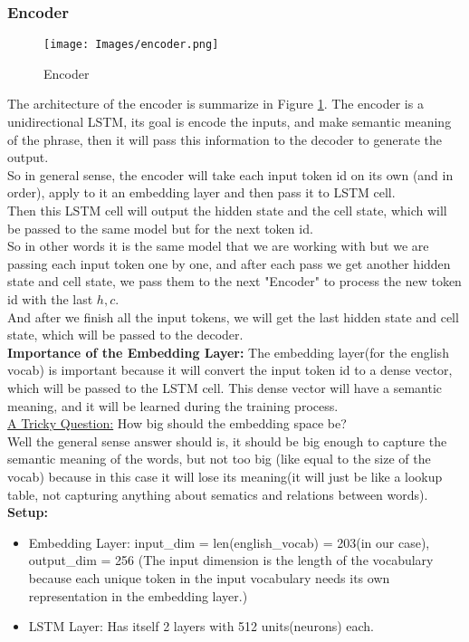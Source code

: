 \documentclass{article}
\begin{document}
\subsubsection{Encoder}
\begin{figure}[H]
    \centering
    \texttt{[image: Images/encoder.png]}
    \caption{Encoder}
    \label{fig:encoder}
\end{figure}
The architecture of the encoder is summarize in Figure \hyperref[fig:encoder]{\ref*{fig:encoder}}.
The encoder is a unidirectional LSTM, its goal is encode the inputs, and make semantic meaning of the phrase, then it will pass this information to the decoder to generate the output.\\
So in general sense, the encoder will take each input token id on its own (and in order), apply to it an embedding layer and then pass it to LSTM cell.\\ Then this LSTM cell will output the hidden state and the cell state, which will be passed to the same model but for the next token id. \\ So in other words it is the same model that we are working with but we are passing each input token one by one, and after each pass we get another hidden state and cell state, we pass them to the next "Encoder" to process the new token id with the last $h,c$.\\
And after we finish all the input tokens, we will get the last hidden state and cell state, which will be passed to the decoder. \\
\textbf{Importance of the Embedding Layer:}
The embedding layer(for the english vocab) is important because it will convert the input token id to a dense vector, which will be passed to the LSTM cell. This dense vector will have a semantic meaning, and it will be learned during the training process.\\
\underline{A Tricky Question:} How big should the embedding space be?\\
Well the general sense answer should is, it should be big enough to capture the semantic meaning of the words, but not too big (like equal to the size of the vocab) because in this case it will lose its meaning(it will just be like a lookup table, not capturing anything about sematics and relations between words).\\
\textbf{Setup:}
\begin{itemize}
    \item Embedding Layer: input\_dim = len(english\_vocab) = 203(in our case), output\_dim = 256 (The input dimension is the length of the vocabulary because each unique token in the input vocabulary needs its own representation in the embedding layer.)
    \item LSTM Layer: Has itself 2 layers with 512 units(neurons) each.
\end{itemize}
\end{document}
